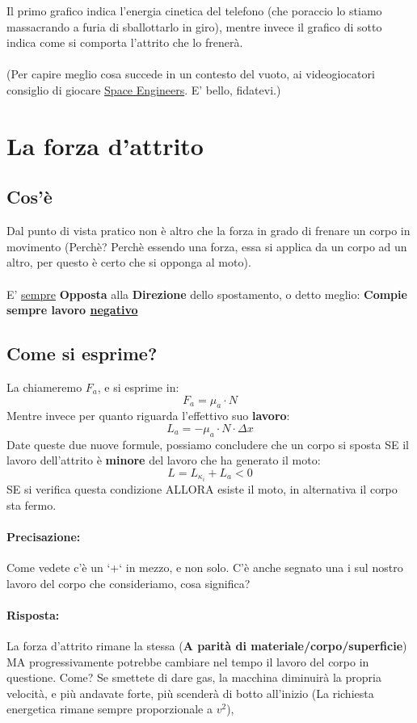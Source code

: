 \documentclass[12pt, a4paper, openany, oneside]{book}
\begin{document}
Il primo grafico indica l'energia cinetica del telefono (che poraccio lo stiamo
massacrando a furia di sballottarlo in giro), mentre invece il grafico di sotto
indica come si comporta l'attrito che lo frenerà.\\ \\
(Per capire meglio cosa succede in un contesto del vuoto, ai videogiocatori 
consiglio di giocare \href{https://store.steampowered.com/app/244850/Space_Engineers/}
{Space Engineers}. E' bello, fidatevi.)
\section{La forza d'attrito}
\subsection{Cos'è}
Dal punto di vista pratico non è altro che la forza in grado di frenare un corpo
in movimento (Perchè? Perchè essendo una forza, essa si applica da un corpo
ad un altro, per questo è certo che si opponga al moto).\\ \\
E' \underline{sempre} \textbf{Opposta} alla \textbf{Direzione} dello spostamento,
o detto meglio: \textbf{Compie sempre lavoro \underline{negativo}} 
\subsection{Come si esprime?}
La chiameremo $F_{a}$, e si esprime in:
\[
F_{a} = \mu_{a}\cdot N
\]
Mentre invece per quanto riguarda l'effettivo suo \textbf{lavoro}:
\[
L_{a} = -\mu_{a}\cdot N \cdot \Delta x
\]
Date queste due nuove formule, possiamo concludere che un corpo si sposta SE
il lavoro dell'attrito è \textbf{minore} del lavoro che ha generato il moto:
\[
L = L_{\kappa_{i}} + L_{a} < 0 
\]
SE si verifica questa condizione ALLORA esiste il moto, in alternativa il corpo
sta fermo. 
\paragraph{Precisazione: } Come vedete c'è un `+` in mezzo, e non solo. C'è 
anche segnato una i sul nostro lavoro del corpo che consideriamo, cosa significa?
\paragraph{Risposta: } La forza d'attrito rimane la stessa (\textbf{A parità
di materiale/corpo/superficie}) MA progressivamente potrebbe cambiare nel tempo
il lavoro del corpo in questione. Come? Se smettete di dare gas, la macchina
diminuirà la propria velocità, e più andavate forte, più scenderà di botto 
all'inizio (La richiesta energetica rimane sempre proporzionale a $v^{2}$),
\end{document}

